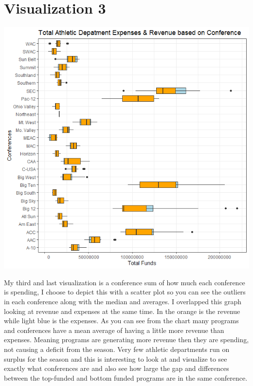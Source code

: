 \documentclass{article}
\begin{document}
\section{Visualization 3}
\includegraphics[scale=.75]{PS6c_Yarberry.png}

My third and last visualization is a conference sum of how much each conference is spending, I choose to depict this with a scatter plot so you can see the outliers in each conference along with the median and averages. I overlapped this graph looking at revenue and expenses at the same time. In the orange is the revenue while light blue is the expenses. As you can see from the chart many programs and conferences have a mean average of having a little more revenue than expenses. Meaning programs are generating more revenue then they are spending, not causing a deficit from the season. Very few athletic departments run on surplus for the season and this is interesting to look at and visualize to see exactly what conferences are and also see how large the gap and differences between the top-funded and bottom funded programs are in the same conference. 
\end{document}
